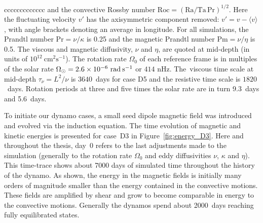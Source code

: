 \begin{deluxetable}{ccccccccccccc}
{	and the convective Rossby number 
	$\mathrm{Roc} = (\mathrm{Ra}/\mathrm{Ta} \, \mathrm{Pr})^{1/2}$.
	Here the fluctuating velocity $v'$ has the axisymmetric
        component removed: $v' = v - \langle v \rangle$, 
        with angle brackets denoting an average in longitude.
	For all simulations, the Prandtl number $\mathrm{Pr} = \nu / \kappa$ is 0.25 
	and the magnetic Prandtl number $\mathrm{Pm}=\nu/\eta$ is 0.5.  
	The viscous and magnetic diffusivity, $\nu$ and $\eta$, are
	quoted at mid-depth (in units of $10^{12}~\mathrm{cm}^2\mathrm{s}^{-1}$).
        The rotation rate $\Omega_0$ of each reference frame is in multiples
        of the solar rate $\Omega_\odot=2.6 \times 10^{-6}~\mathrm{rad}\:\mathrm{s}^{-1}$ or $414$ nHz.  
        The~viscous time scale at mid-depth $\tau_\nu = L^2/\nu$ is
        $3640$~days for case D5 and the resistive time scale is $1820$~days.
	Rotation periods at three and five times the solar rate are in turn 9.3~days and 5.6~days.
	}
\end{deluxetable}



To initiate our dynamo cases, a small seed dipole magnetic field was
introduced and evolved via the induction equation.  The time evolution
of magnetic and kinetic energies is presented for case~D3 in
Figure~\ref{fig:energy_D3}.  Here and throughout the thesis, day~0
refers to the last adjustments made to the simulation 
(generally to the rotation rate $\Omega_0$ and eddy diffusivities
$\nu$, $\kappa$ and $\eta$).  This time-trace shows about 7000
days of simulated time throughout the history of the dynamo. 
As shown, the energy in the
magnetic fields is initially many orders of magnitude smaller than the
energy contained in the convective motions.  These fields are
amplified by shear and grow to become comparable in energy to the
convective motions.  Generally the dynamos spend about 2000~days
reaching fully equilibrated states.


